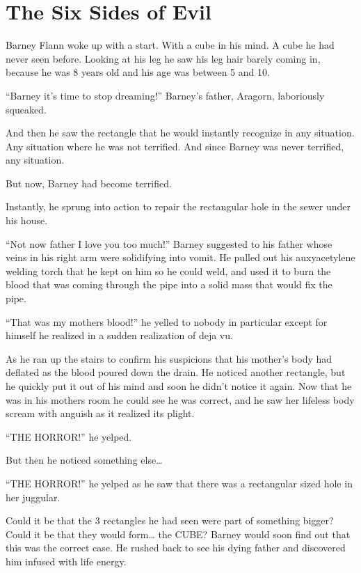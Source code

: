 \chapter{The Six Sides of Evil}


Barney Flann woke up with a start. With a cube in his mind. A cube
he had never seen before. Looking at his leg he saw his leg hair
barely coming in, because he was 8 years old and his age was
between 5 and 10.

``Barney it's time to stop dreaming!'' Barney's father, Aragorn,
laboriously squeaked.

And then he saw the rectangle that he would instantly recognize in
any situation. Any situation where he was not terrified. And since
Barney was never terrified, any situation.

But now, Barney had become terrified.

Instantly, he sprung into action to repair the rectangular hole in
the sewer under his house.

``Not now father I love you too much!'' Barney suggested to his
father whose veins in his right arm were solidifying into vomit. He
pulled out his auxyacetylene welding torch that he kept on him so
he could weld, and used it to burn the blood that was coming
through the pipe into a solid mass that would fix the pipe.

``That was my mothers blood!'' he yelled to nobody in particular
except for himself he realized in a sudden realization of deja
vu.

As he ran up the stairs to confirm his suspicions that his mother's
body had deflated as the blood poured down the drain. He noticed
another rectangle, but he quickly put it out of his mind and soon
he didn't notice it again. Now that he was in his mothers room he
could see he was correct, and he saw her lifeless body scream with
anguish as it realized its plight.

``THE HORROR!'' he yelped.

But then he noticed something else{\ldots}

``THE HORROR!'' he yelped as he saw that there was a rectangular
sized hole in her juggular.

Could it be that the 3 rectangles he had seen were part of
something bigger? Could it be that they would form{\ldots} the CUBE?
Barney would soon find out that this was the correct case. He
rushed back to see his dying father and discovered him infused with
life energy.

